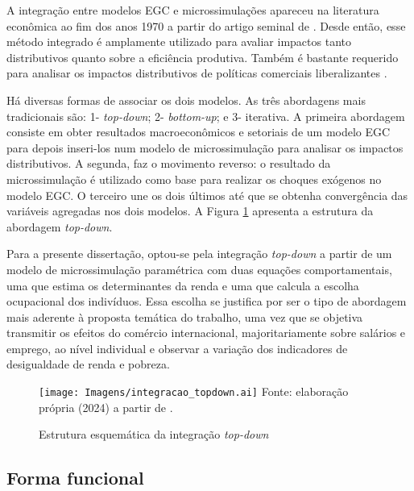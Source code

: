 A integração entre modelos EGC e microssimulações apareceu na literatura econômica ao fim dos anos 1970 a partir do artigo seminal de \textcite{adelman78}. Desde então, esse método integrado é amplamente utilizado para avaliar impactos tanto distributivos quanto sobre a eficiência produtiva. Também é bastante requerido para analisar os impactos distributivos de políticas comerciais liberalizantes \cite{carneiro06, ferreira06, raihan10, cicowiez16, mbanda21}.

Há diversas formas de associar os dois modelos. As três abordagens mais tradicionais são: 1- \textit{top-down}; 2- \textit{bottom-up}; e 3- iterativa. A primeira abordagem consiste em obter resultados macroeconômicos e setoriais de um modelo EGC para depois inseri-los num modelo de microssimulação para analisar os impactos distributivos. A segunda, faz o movimento reverso: o resultado da microssimulação é utilizado como base para realizar os choques exógenos no modelo EGC. O terceiro une os dois últimos até que se obtenha convergência das variáveis agregadas nos dois modelos. A Figura \ref{fig:microssimulacao} apresenta a estrutura da abordagem \textit{top-down}.

Para a presente dissertação, optou-se pela integração \textit{top-down} a partir de um modelo de microssimulação paramétrica com duas equações comportamentais, uma que estima os determinantes da renda e uma que calcula a escolha ocupacional dos indivíduos. Essa escolha se justifica por ser o tipo de abordagem mais aderente à proposta temática do trabalho, uma vez que se objetiva transmitir os efeitos do comércio internacional, majoritariamente sobre salários e emprego, ao nível individual e observar a variação dos indicadores de desigualdade de renda e pobreza.

\begin{landscape}
	\begin{figure}
		\centering
		\caption{Estrutura esquemática da integração \textit{top-down}} \label{fig:microssimulacao}
		\texttt{[image: Imagens/integracao\_topdown.ai]}
		\footnotesize
		Fonte: elaboração própria (2024) a partir de \textcite{tiberti17}.
	\end{figure}
\end{landscape}


\subsection{Forma funcional} \label{subsec:forma_funcional}

